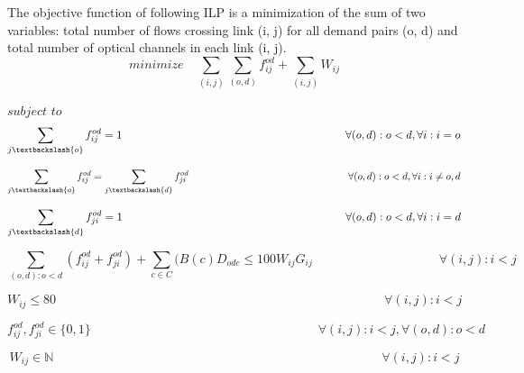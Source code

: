 The objective function of following ILP is a minimization of the sum of two variables: total number of flows crossing link (i, j) for all demand pairs (o, d) and total number of optical channels in each link (i, j).\\

\begin{equation}
minimize \quad \sum_{(i,j)} \sum_{(o,d)} f_{ij}^{od} + \sum_{(i,j)} W_{ij}
\label{ILPOpaque_Surv}
\end{equation}

$subject$ $to$
\begin{equation}
\sum_{j\textbackslash \{o\}} f_{ij}^{od} = 1  \qquad \qquad \qquad \qquad \qquad \qquad \qquad \qquad \qquad \qquad
\forall(o,d) : o < d, \forall i: i = o
\label{ILPOpaque1_Surv}
\end{equation}

\begin{equation}
\sum_{j\textbackslash \{o\}} f_{ij}^{od} = \sum_{j\textbackslash \{d\}} f_{ji}^{od}   \qquad \qquad \qquad \qquad \qquad \qquad \qquad \qquad
\forall(o,d) : o < d, \forall i: i \neq o,d
\label{ILPOpaque2_Surv}
\end{equation}

\begin{equation}
\sum_{j\textbackslash \{d\}} f_{ji}^{od} = 1  \qquad \qquad \qquad \qquad \qquad \qquad \qquad \qquad \qquad \qquad
\forall(o,d) : o < d, \forall i: i = d
\label{ILPOpaque3_Surv}
\end{equation}

\begin{equation}
\sum_{(o,d):o<d} \left(f_{ij}^{od} + f_{ji}^{od}\right) + \sum_{c\in C} (B\left(c\right) D_{odc}\leq100 W_{ij} G_{ij} \qquad \qquad \qquad \qquad \qquad
\forall(i,j) : i < j
\label{ILPOpaque4_Surv}
\end{equation}

\begin{equation}
W_{ij} \leq 80 \qquad  \qquad \qquad \qquad \qquad \qquad \qquad \qquad \qquad \qquad \qquad \qquad \qquad \forall(i,j) : i < j
\label{ILPOpaque5_Surv}
\end{equation}

\begin{equation}
f_{ij}^{od} , f_{ji}^{od} \in \{0,1\}   \qquad \qquad \qquad \qquad \qquad \qquad \qquad \qquad \qquad
\forall(i,j) : i < j, \forall(o,d) : o < d
\label{ILPOpaque6_Surv}
\end{equation}

\begin{equation}
W_{ij} \in \mathbb{N}  \qquad \qquad \qquad \qquad \qquad \qquad \qquad \qquad \qquad \qquad \qquad \qquad \qquad
\forall(i,j) : i < j
\label{ILPOpaque7_Surv}
\end{equation}

